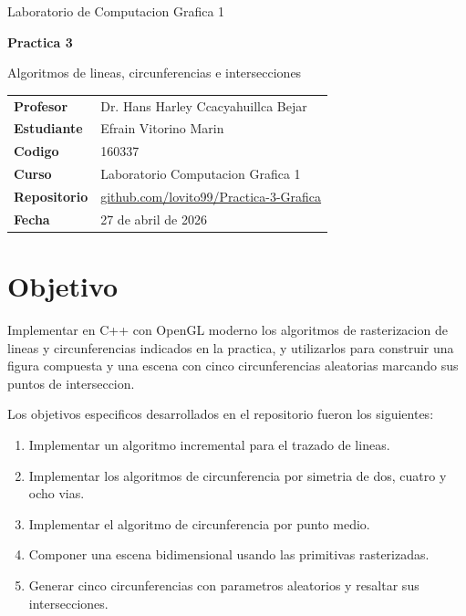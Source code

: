 \documentclass[12pt,a4paper]{article}
\begin{document}

\begin{titlepage}
	\centering
	{\Large Laboratorio de Computacion Grafica 1\par}
	\vspace{1.2cm}
	{\LARGE \textbf{Practica 3}\par}
	\vspace{0.4cm}
	{\Large Algoritmos de lineas, circunferencias e intersecciones\par}
	\vspace{2cm}

	\begin{tabular}{>{\bfseries}p{4.5cm}p{9cm}}
		Profesor & Dr. Hans Harley Ccacyahuillca Bejar \\
		Estudiante & Efrain Vitorino Marin \\
		Codigo & 160337 \\
		Curso & Laboratorio Computacion Grafica 1 \\
		Repositorio & \href{https://github.com/lovito99/Practica-3-Grafica}{github.com/lovito99/Practica-3-Grafica} \\
		Fecha & 27 de abril de 2026 \\
	\end{tabular}

	\vfill
\end{titlepage}

\clearpage
{}

\section{Objetivo}

Implementar en C++ con OpenGL moderno los algoritmos de rasterizacion de lineas y circunferencias indicados en la practica, y utilizarlos para construir una figura compuesta y una escena con cinco circunferencias aleatorias marcando sus puntos de interseccion.

Los objetivos especificos desarrollados en el repositorio fueron los siguientes:

\begin{enumerate}
	\item Implementar un algoritmo incremental para el trazado de lineas.
	\item Implementar los algoritmos de circunferencia por simetria de dos, cuatro y ocho vias.
	\item Implementar el algoritmo de circunferencia por punto medio.
	\item Componer una escena bidimensional usando las primitivas rasterizadas.
	\item Generar cinco circunferencias con parametros aleatorios y resaltar sus intersecciones.
\end{enumerate}
\end{document}
